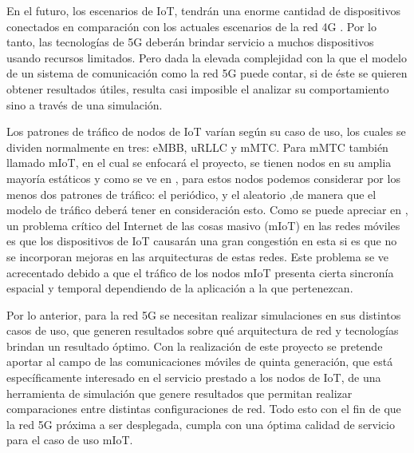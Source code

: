 En el futuro, los escenarios de IoT, tendrán una enorme cantidad de dispositivos conectados en comparación con los actuales escenarios de la red 4G \parencite{Whatis5G}. Por lo tanto, las tecnologías de 5G deberán brindar servicio a muchos dispositivos usando recursos limitados. Pero dada la elevada complejidad con la que el modelo de un sistema de comunicación como la red 5G puede contar, si de éste se quieren obtener resultados útiles, resulta casi imposible el analizar su comportamiento sino a través de una simulación.\newline

Los patrones de tráfico de nodos de IoT varían según su caso de uso, los cuales se dividen normalmente en tres: eMBB, uRLLC y mMTC. Para mMTC también llamado mIoT, en el cual se enfocará el proyecto, se tienen nodos en su amplia mayoría estáticos y como se ve en \parencite{IoTTrafficHossfeld}, para estos nodos podemos considerar por los menos dos patrones de tráfico: el periódico, y el aleatorio ,de manera que el modelo de tráfico deberá tener en consideración esto. Como se puede apreciar en \parencite{IoTTrafficHossfeld}, un problema crítico del Internet de las cosas masivo (mIoT) en las redes móviles es que los dispositivos de IoT causarán una gran congestión en esta si es que no se incorporan mejoras en las arquitecturas de estas redes. Este problema se ve acrecentado debido a que el tráfico de los nodos mIoT presenta cierta sincronía espacial y temporal dependiendo de la aplicación a la que pertenezcan.\newline

Por lo anterior, para la red 5G se necesitan realizar simulaciones en sus distintos casos de uso, que generen resultados sobre qué arquitectura de red y tecnologías brindan un resultado óptimo. Con la realización de este proyecto se pretende aportar al campo de las comunicaciones móviles de quinta generación, que está específicamente interesado en el servicio prestado a los nodos de IoT, de una herramienta de simulación que genere resultados que permitan realizar comparaciones entre distintas configuraciones de red. Todo esto con el fin de que la red 5G próxima a ser desplegada, cumpla con una óptima calidad de servicio para el caso de uso mIoT.\newline


